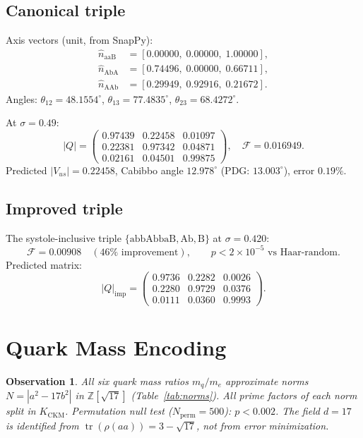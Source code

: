 \documentclass[11pt,a4paper]{article}
\newtheorem{observation}{Observation}
\begin{document}
\subsection{Canonical triple}

Axis vectors (unit, from SnapPy):
\begin{align*}
  \hat{n}_{\mathrm{aaB}} &= [0.00000,\;0.00000,\;1.00000],\\
  \hat{n}_{\mathrm{AbA}} &= [0.74496,\;0.00000,\;0.66711],\\
  \hat{n}_{\mathrm{AAb}} &= [0.29949,\;0.92916,\;0.21672].
\end{align*}
Angles: $\theta_{12}=48.1554^\circ$, $\theta_{13}=77.4835^\circ$,
$\theta_{23}=68.4272^\circ$.

At $\sigma=0.49$:
\[
  |Q| = \begin{pmatrix}
    0.97439 & 0.22458 & 0.01097 \\
    0.22381 & 0.97342 & 0.04871 \\
    0.02161 & 0.04501 & 0.99875
  \end{pmatrix},
  \quad \mathcal{F}=0.016949.
\]
Predicted $|V_{us}|=0.22458$, Cabibbo angle $12.978^\circ$
(PDG: $13.003^\circ$), error $0.19\%$.

\subsection{Improved triple}

The systole-inclusive triple
$\{\mathrm{abbAbbaB},\mathrm{Ab},\mathrm{B}\}$
at $\sigma=0.420$:
\[
  \mathcal{F}=0.00908\quad(46\%\text{ improvement}),
  \qquad p<2\times10^{-5}\text{ vs Haar-random}.
\]
Predicted matrix:
\[
  |Q|_{\mathrm{imp}} = \begin{pmatrix}
    0.9736 & 0.2282 & 0.0026 \\
    0.2280 & 0.9729 & 0.0376 \\
    0.0111 & 0.0360 & 0.9993
  \end{pmatrix}.
\]

\section{Quark Mass Encoding}
\label{sec:masses}

\begin{observation}
All six quark mass ratios $m_q/m_e$ approximate norms
$N=|a^2-17b^2|$ in $\mathbb{Z}[\sqrt{17}]$
(Table~\ref{tab:norms}).
All prime factors of each norm split in $K_{\mathrm{CKM}}$.
Permutation null test ($N_{\mathrm{perm}}=500$): $p<0.002$.
The field $d=17$ is identified from
$\operatorname{tr}(\rho(aa))=3-\sqrt{17}$, not from error minimization.
\end{observation}
\end{document}
